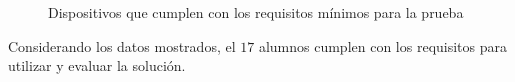 \begin{figure}[H]
       \centering
        \caption{Dispositivos que cumplen con los requisitos mínimos para la prueba}
		\label{fig:ubicacion_requisitos_minimos}
\end{figure}

Considerando los datos mostrados, el $17$ alumnos cumplen con los requisitos para utilizar y evaluar 
la solución.



